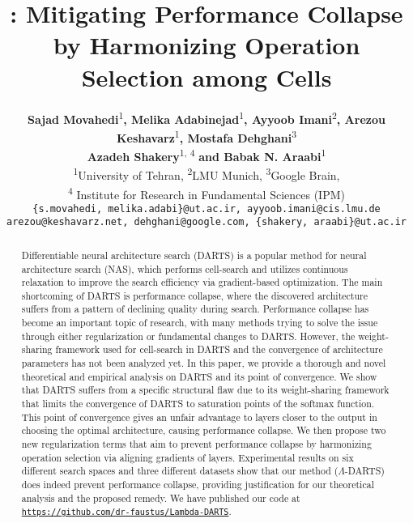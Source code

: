 \documentclass{article} \usepackage{fancyhdr, iclr2023_conference, times}
\title{\mydarts: Mitigating Performance Collapse by Harmonizing Operation Selection among Cells}
\author{\normalfont \hspace{-5pt}\begin{tabular}{@{}lll@{}}
\\
\textbf{Sajad Movahedi}\textsuperscript{1}\textbf{, Melika Adabinejad}\textsuperscript{1}\textbf{, Ayyoob Imani}\textsuperscript{2}\textbf{, Arezou Keshavarz}\textsuperscript{1}\textbf{, Mostafa Dehghani}\textsuperscript{3}\\
\textbf{Azadeh Shakery}\textsuperscript{1, 4}\textbf{ and Babak N. Araabi}\textsuperscript{1}\\
\textsuperscript{1}University of Tehran, \textsuperscript{2}LMU Munich, \textsuperscript{3}Google Brain, \\\textsuperscript{4} Institute for Research in Fundamental Sciences (IPM)
\\
\texttt{\{s.movahedi, melika.adabi\}@ut.ac.ir, ayyoob.imani@cis.lmu.de}\\
\texttt{arezou@keshavarz.net,
dehghani@google.com,
\{shakery, araabi\}@ut.ac.ir}
\end{tabular}
}
\newcommand{\mydarts}{$\Lambda$-DARTS\xspace}
\begin{document}
\setlength{}
\setlength\emergencystretch{1pt}

\maketitle

\begin{abstract}
Differentiable neural architecture search (DARTS) is a popular method for neural architecture search (NAS), which performs cell-search and utilizes continuous relaxation to improve the search efficiency via gradient-based optimization. The main shortcoming of DARTS is performance collapse, where the discovered architecture suffers from a pattern of declining quality during search. Performance collapse has become an important topic of research, with many methods trying to solve the issue through either regularization or fundamental changes to DARTS.
However, the weight-sharing framework used for cell-search in DARTS and the convergence of architecture parameters has not been analyzed yet. In this paper, we provide a thorough and novel theoretical and empirical analysis on DARTS and its point of convergence.
We show that DARTS suffers from a specific structural flaw due to its weight-sharing framework that limits the convergence of DARTS to saturation points of the softmax function. This point of convergence gives an unfair advantage to layers closer to the output in choosing the optimal architecture, causing performance collapse. We then propose two new regularization terms that aim to prevent performance collapse by harmonizing operation selection via aligning gradients of layers. 
Experimental results on six different search spaces and three different datasets show that our method (\mydarts) does indeed prevent performance collapse, providing justification for our theoretical analysis and the proposed remedy. We have published our code at \href{https://github.com/dr-faustus/Lambda-DARTS}{\texttt{https://github.com/dr-faustus/Lambda-DARTS}}.
\end{abstract}
\end{document}
